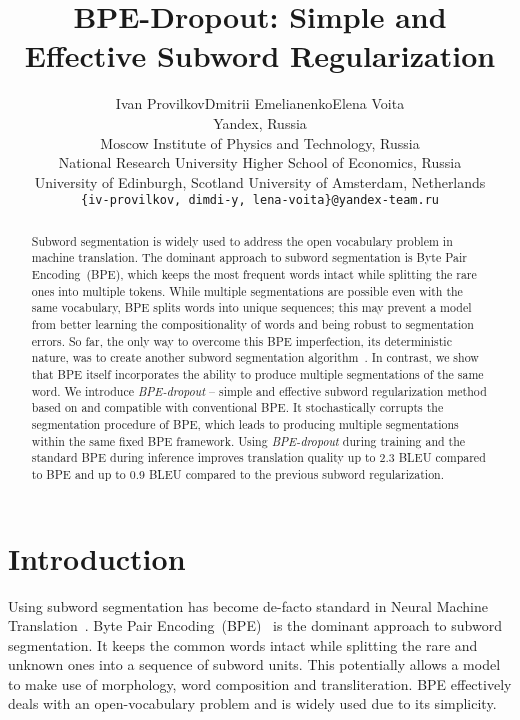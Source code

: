 \documentclass[11pt,a4paper]{article}
\title{BPE-Dropout: Simple and Effective Subword Regularization}
\author{Ivan Provilkov\footnotemark[1] \quad Dmitrii Emelianenko\footnotemark[1] \quad Elena Voita\bigskip\\
  Yandex, Russia \\
  Moscow Institute of Physics and Technology, Russia\\
  National Research University Higher School of Economics, Russia\\
  University of Edinburgh, Scotland
  \quad University of Amsterdam, Netherlands\\{\tt \{iv-provilkov, dimdi-y, lena-voita\}@yandex-team.ru}
}
\date{}
\renewcommand{\thefootnote}{\fnsymbol{footnote}}
\begin{document}
\maketitle
\begin{abstract}



  Subword segmentation is widely used to address the open vocabulary problem in machine translation. The dominant approach to subword segmentation is Byte Pair Encoding~(BPE), which keeps the most frequent words intact while splitting the rare ones into multiple tokens. While multiple segmentations are possible even with the same vocabulary, BPE splits words into unique sequences; this may prevent a model from better learning the compositionality of words and being robust to segmentation errors. 
So far, the only way to overcome this BPE imperfection, its deterministic nature, was to create another subword segmentation algorithm~\cite{sentencepiece}. In contrast, we show that BPE itself incorporates the ability to produce multiple segmentations of the same word. 
We introduce \textit{BPE-dropout} -- simple and effective subword regularization method based on and compatible with conventional BPE.
It stochastically corrupts the segmentation procedure of BPE, which leads to producing multiple segmentations within the same fixed BPE framework.
Using \textit{BPE-dropout} during training and the standard BPE during inference improves translation quality up to 2{.}3 BLEU compared to BPE and up to 0{.}9 BLEU compared to the previous subword regularization.
 


\end{abstract}


\renewcommand{\thefootnote}{\arabic{footnote}}

\section{Introduction}


Using subword segmentation has become de-facto standard in Neural Machine Translation~\cite{bojar-etal-2018-findings,barrault-etal-2019-findings}. Byte Pair Encoding~(BPE)~\cite{sennrich-etal-2016-neural} is the dominant approach to subword segmentation. It keeps the common words intact while splitting the rare and unknown ones into a sequence of subword units. This potentially allows a model to make use of morphology, word composition and transliteration. BPE effectively deals with an open-vocabulary problem and is widely used due to its simplicity. 
\end{document}
